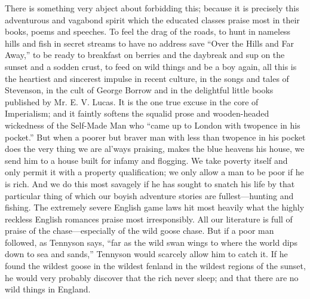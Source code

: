 \documentclass{book}
\begin{document}
There is something very abject about forbidding this; because it is precisely this adventurous and vagabond spirit which the educated classes praise most in their books, poems and speeches. To feel the drag of the roads, to hunt in nameless hills and fish in secret streams to have no address save “Over the Hills and Far Away,” to be ready to breakfast on berries and the daybreak and sup on the sunset and a sodden crust, to feed on wild things and be a boy again, all this is the heartiest and sincerest impulse in recent culture, in the songs and tales of Stevenson, in the cult of George Borrow and in the delightful little books published by Mr. E. V. Lucas. It is the one true excuse in the core of Imperialism; and it faintly softens the squalid prose and wooden-headed wickedness of the Self-Made Man who “came up to London with twopence in his pocket.” But when a poorer but braver man with less than twopence in his pocket does the very thing we are al’ways praising, makes the blue heavens his house, we send him to a house built for infamy and flogging. We take poverty itself and only permit it with a property qualification; we only allow a man to be poor if he is rich. And we do this most savagely if he has sought to snatch his life by that particular thing of which our boyish adventure stories are fullest—hunting and fishing. The extremely severe English game laws hit most heavily what the highly reckless English romances praise most irresponsibly. All our literature is full of praise of the chase—especially of the wild goose chase. But if a poor man followed, as Tennyson says, “far as the wild swan wings to where the world dips down to sea and sands,” Tennyson would scarcely allow him to catch it. If he found the wildest goose in the wildest fenland in the wildest regions of the sunset, he would very probably discover that the rich never sleep; and that there are no wild things in England.
\end{document}
